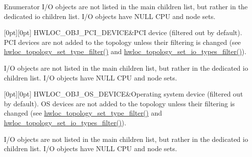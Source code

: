 \begin{DoxyEnumFields}{Enumerator}
I/O objects are not listed in the main children list, but rather in the dedicated io children list. I/O objects have N\+U\+LL C\+PU and node sets. \\
\hline

[0pt][0pt]{}\mbox{\label{a00184_ggacd37bb612667dc437d66bfb175a8dc55a5d8117a54df1fbd3606ab19e42cb0ea9}} 
H\+W\+L\+O\+C\+\_\+\+O\+B\+J\+\_\+\+P\+C\+I\+\_\+\+D\+E\+V\+I\+CE&P\+CI device (filtered out by default). P\+CI devices are not added to the topology unless their filtering is changed (see \hyperlink{a00193_gad894e70f15f8d4aada7be8d1aba38b7e}{hwloc\+\_\+topology\+\_\+set\+\_\+type\+\_\+filter()} and \hyperlink{a00193_ga0ab38705357bc1203abe829da8a12ad3}{hwloc\+\_\+topology\+\_\+set\+\_\+io\+\_\+types\+\_\+filter()}).

I/O objects are not listed in the main children list, but rather in the dedicated io children list. I/O objects have N\+U\+LL C\+PU and node sets. \\
\hline

[0pt][0pt]{}\mbox{\label{a00184_ggacd37bb612667dc437d66bfb175a8dc55a51e7280240fd9f25589cbbe538bdb075}} 
H\+W\+L\+O\+C\+\_\+\+O\+B\+J\+\_\+\+O\+S\+\_\+\+D\+E\+V\+I\+CE&Operating system device (filtered out by default). OS devices are not added to the topology unless their filtering is changed (see \hyperlink{a00193_gad894e70f15f8d4aada7be8d1aba38b7e}{hwloc\+\_\+topology\+\_\+set\+\_\+type\+\_\+filter()} and \hyperlink{a00193_ga0ab38705357bc1203abe829da8a12ad3}{hwloc\+\_\+topology\+\_\+set\+\_\+io\+\_\+types\+\_\+filter()}).

I/O objects are not listed in the main children list, but rather in the dedicated io children list. I/O objects have N\+U\+LL C\+PU and node sets. \\
\hline


\end{DoxyEnumFields}
